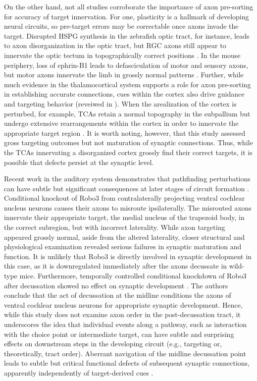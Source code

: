 On the other hand, not all studies corroborate the importance of axon pre-sorting for accuracy of target innervation.
For one, plasticity is a hallmark of developing neural circuits, so pre-target errors may be correctable once axons invade the target.
Disrupted HSPG synthesis in the zebrafish optic tract, for instance, leads to axon disorganization in the optic tract, but RGC axons still appear to innervate the optic tectum in topographically correct positions \cite{lee2004axon}.
In the mouse periphery, loss of ephrin-B1 leads to defasciculation of motor and sensory axons, but motor axons innervate the limb in grossly normal patterns \cite{luxey2013eph}.
Further, while much evidence in the thalamocortical system supports a role for axon pre-sorting in establishing accurate connections, cues within the cortex also drive guidance and targeting behavior (reveiwed in ).
When the arealization of the cortex is perturbed, for example, TCAs retain a normal topography in the subpallium but undergo extensive rearrangements within the cortex in order to innervate the appropriate target region \cite{shimogori2005fibroblast}.
It is worth noting, however, that this study assessed gross targeting outcomes but not maturation of synaptic connections.
Thus, while the TCAs innervating a disorganized cortex grossly find their correct targets, it is possible that defects persist at the synaptic level.

Recent work in the auditory system demonstrates that pathfinding perturbations can have subtle but significant consequences at later stages of circuit formation \cite{michalski2013robo3}.
Conditional knockout of Robo3 from contralaterally projecting ventral cochlear nucleus neurons causes their axons to misroute ipsilaterally.
The misrouted axons innervate their appropriate target, the medial nucleus of the trapezoid body, in the correct subregion, but with incorrect laterality. 
While axon targeting appeared grossly normal, aside from the altered laterality, closer structural and physiological examination revealed serious failures in synaptic maturation and function.
It is unlikely that Robo3 is directly involved in synaptic development in this case, as it is downregulated immediately after the axons decussate in wild-type mice. 
Furthermore, temporally controlled conditional knockdown of Robo3 after decussation showed no effect on synaptic development \cite{michalski2013robo3}.
The authors conclude that the act of decussation at the midline conditions the axons of ventral cochlear nucleus neurons for appropriate synaptic development.
Hence, while this study does not examine axon order in the post-decussation tract, it underscores the idea that individual events along a pathway, such as interaction with the choice point or intermediate target, can have subtle and surprising effects on downstream steps in the developing circuit (e.g., targeting or, theoretically, tract order).
Aberrant navigation of the midline decussation point leads to subtle but critical functional defects of subsequent synaptic connections, apparently independently of target-derived cues \cite{michalski2013robo3}.